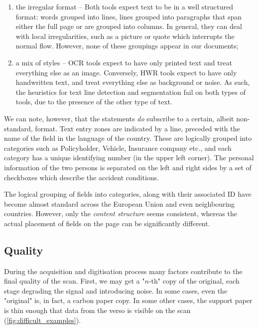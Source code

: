 \begin{enumerate}
	\item the irregular format -- Both tools expect text to be in a well structured format: words grouped into lines, lines grouped into paragraphs that span either the full page or are grouped into columns. In general, they can deal with local irregularities, such as a picture or quote which interrupts the normal flow. However, none of these groupings appear in our documents;

	\item a mix of styles -- OCR tools expect to have only printed text and treat everything else as an image. Conversely, HWR tools expect to have only handwritten text, and treat everything else as background or noise. As such, the heuristics for text line detection and segmentation fail on both types of tools, due to the presence of the other type of text.
\end{enumerate}

We can note, however, that the statements \emph{do} subscribe to a certain, albeit non-standard, format. Text entry zones are indicated by a line, preceded with the name of the field in the language of the country. These are logically grouped into categories such as Policyholder, Vehicle, Insurance company etc., and each category has a unique identifying number (in the upper left corner). The personal information of the two persons is separated on the left and right sides by a set of checkboxes which describe the accident conditions.

The logical grouping of fields into categories, along with their associated ID have become almost standard across the European Union and even neighbouring countries. However, only the \emph{content structure} seems consistent, whereas the actual placement of fields on the page can be significantly different.




\subsection{Quality}

During the acquisition and digitisation process many factors contribute to the final quality of the scan. First, we may get a "$n$-th" copy of the original, each stage degrading the signal and introducing noise. In some cases, even the "original" is, in fact, a carbon paper copy. In some other cases, the support paper is thin enough that data from the verso is visible on the scan (\cref{fig:difficult_examples}).

